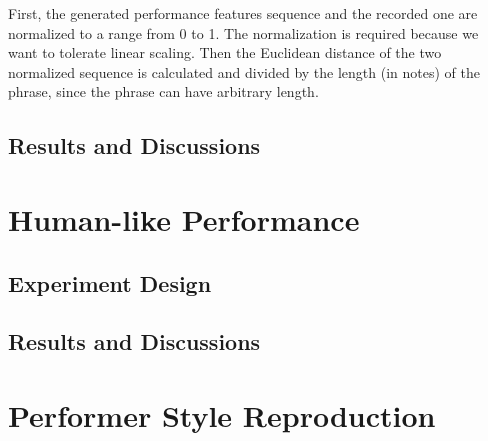First, the generated performance features sequence and the recorded one are normalized to a range from 0 to 1. The normalization is required because we want to tolerate linear scaling. Then the Euclidean distance of the two normalized sequence is calculated and divided by the length (in notes) of the phrase, since the phrase can have arbitrary length.




%
%
\subsection{Results and Discussions}

\section{Human-like Performance}
\subsection{Experiment Design}

\subsection{Results and Discussions}

\section{Performer Style Reproduction}
